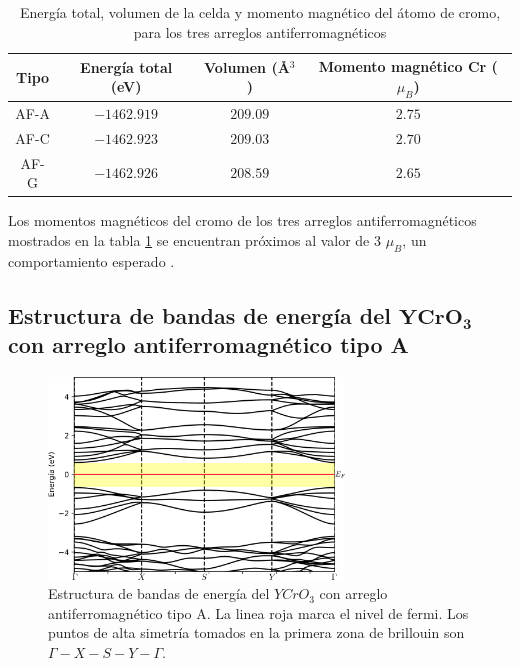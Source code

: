  \begin{table}[H]
	\begin{center}
		\begin{tabular}{cccc}
			\hline
			\textbf{Tipo} & \textbf{Energ\'ia total (eV)} & \textbf{Volumen 
			(\AA $^{3}$)} & \textbf{Momento magn\'etico Cr ($\mu _{B}$)}\\
			\hline \hline
			AF-A & $-1462.919$ & $209.09$ & $2.75$ \\
			\hline
			AF-C & $-1462.923$ & $209.03$ & $2.70$ \\
			\hline
			AF-G & $-1462.926$ & $208.59$ & $2.65$ \\
			\hline
		\end{tabular}
		\singlespace
		\caption{Energ\'ia total, volumen de la celda y momento magn\'etico del 
		\'atomo de cromo,
			para los tres arreglos antiferromagn\'eticos}
		\label{tabla_YCrO3_ener_vol_mag}
	\end{center}
\end{table}

\noindent Los momentos magn\'eticos del cromo de los tres arreglos 
antiferromagn\'eticos 
mostrados en la tabla \ref{tabla_YCrO3_ener_vol_mag} se encuentran pr\'oximos 
al valor de 3 $\mu _{B}$, un comportamiento esperado \cite{nair2013,serrao2005}.


\subsection{Estructura de bandas de energ\'ia del $\mathbf{YCrO_{3}}$ con      
    arreglo antiferromagn\'etico tipo A}


\begin{figure}[H]
	\centering
	\includegraphics[width=0.7\textwidth]{contenido/resultados/cromita_itrio/img_cromita_itrio/YCrO3_bandas_A_inf.png}
	\singlespace
	\caption[Bandas de energ\'ia del $YCrO_{3}$ con arreglo 
	antiferromagn\'etico tipo A]{Estructura de bandas de energ\'ia del 
	$YCrO_{3}$ con arreglo antiferromagn\'etico tipo A. La linea roja marca el 
	nivel de fermi. Los puntos de alta simetr\'ia tomados en la primera zona de 
	brillouin son $\Gamma - X - S - Y - \Gamma$.}
	\label{yco_band_a}
\end{figure}


